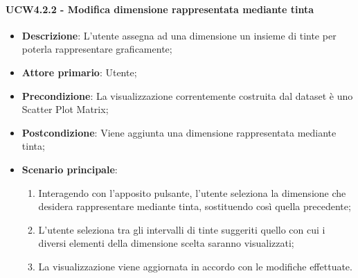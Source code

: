 \paragraph{UCW4.2.2 - Modifica dimensione rappresentata mediante tinta}
\label{par:ucw4.2.2}
\begin{itemize}

    \item \textbf{Descrizione}:     L'utente assegna ad una dimensione un insieme di tinte per poterla rappresentare
                                    graficamente;

    \item \textbf{Attore primario}: Utente;
    \item \textbf{Precondizione}:   La visualizzazione correntemente costruita dal dataset è uno Scatter Plot Matrix;
    \item \textbf{Postcondizione}:  Viene aggiunta una dimensione rappresentata mediante tinta;
    \item \textbf{Scenario principale}:
    \begin{enumerate}

        \item   Interagendo con l'apposito pulsante, l'utente seleziona la dimensione che desidera rappresentare
                mediante tinta, sostituendo così quella precedente;

        \item   L'utente seleziona tra gli intervalli di tinte suggeriti quello con cui i diversi elementi della
                dimensione scelta saranno visualizzati;

        \item   La visualizzazione viene aggiornata in accordo con le modifiche effettuate.
    \end{enumerate}
\end{itemize}


